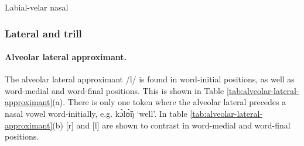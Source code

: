 \begin{table}[!htb]
\small
\centering
\caption{Labial-velar nasal\label{tab:labialvelar-nasal}}

\quad
{}
\end{table}




\subsubsection{Lateral and trill}
\label{sec:approx}


\paragraph{Alveolar lateral approximant.}

The alveolar lateral approximant /{\sls l}/ is found in word-initial positions, 
as well 
as word-medial and word-final positions. This is shown in Table 
\ref{tab:alveolar-lateral-approximant}(a).  There is only one token where the 
alveolar lateral precedes a nasal vowel word-initially, e.g. {\sls kɔ̀lʊ̃̀ŋ́} 
`well'.    In table \ref{tab:alveolar-lateral-approximant}(b)  [r] and  [l] are 
shown to contrast in word-medial and word-final positions.

